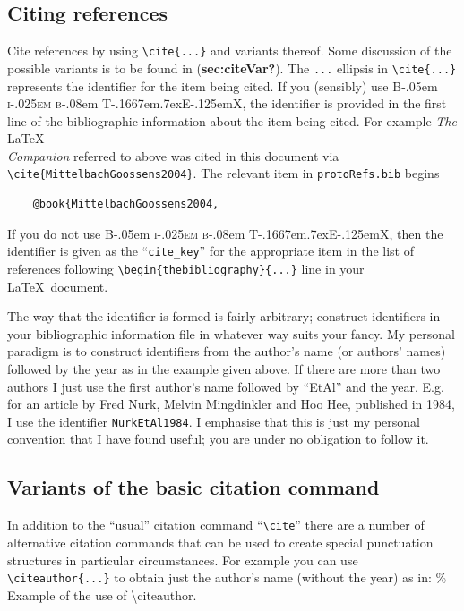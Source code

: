 \documentclass[
  times,
  doublespace]{anzsauth}
\newcommand\BibTeX{{\rmfamily B\kern-.05em \textsc{i\kern-.025em b}\kern-.08em
T\kern-.1667em\lower.7ex\hbox{E}\kern-.125emX}}
\begin{document}
\subsection{Citing references}\label{sec:citRef}

Cite references by using \texttt{\textbackslash{}cite\{...\}} and
variants thereof. Some discussion of the possible variants is to be
found in (\textbf{sec:citeVar?}). The \texttt{...} ellipsis in
\texttt{\textbackslash{}cite\{...\}} represents the identifier for the
item being cited. If you (sensibly) use \BibTeX, the identifier is
provided in the first line of the bibliographic information about the
item being cited. For example \emph{The} \LaTeX\\
\emph{Companion} referred to above was cited in this document via
\texttt{\textbackslash{}cite\{MittelbachGoossens2004\}}. The relevant
item in \texttt{protoRefs.bib} begins

\begin{verbatim}
    @book{MittelbachGoossens2004,
\end{verbatim}

If you do not use \BibTeX, then the identifier is given as the
``\texttt{cite\_key}'' for the appropriate item in the list of
references following
\texttt{\textbackslash{}begin\{thebibliography\}\{...\}} line in your
\LaTeX~document.

The way that the identifier is formed is fairly arbitrary; construct
identifiers in your bibliographic information file in whatever way suits
your fancy. My personal paradigm is to construct identifiers from the
author's name (or authors' names) followed by the year as in the example
given above. If there are more than two authors I just use the first
author's name followed by ``EtAl'' and the year. E.g. for an article by
Fred Nurk, Melvin Mingdinkler and Hoo Hee, published in 1984, I use the
identifier \texttt{NurkEtAl1984}. I emphasise that this is just my
personal convention that I have found useful; you are under no
obligation to follow it.

\subsection{Variants of the basic citation command}\label{sec:citeVar}

In addition to the ``usual'' citation command
``\texttt{\textbackslash{}cite}'' there are a number of alternative
citation commands that can be used to create special punctuation
structures in particular circumstances. For example you can use
\texttt{\textbackslash{}citeauthor\{...\}} to obtain just the author's
name (without the year) as in: \% Example of the use of
\textbackslash citeauthor.
\end{document}
